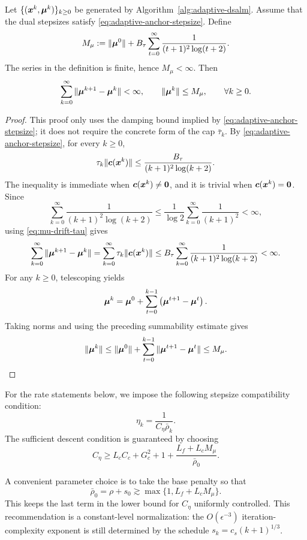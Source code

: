 \documentclass[10pt]{article}
\begin{document}
\begin{lemma}
\label{lem:mu-bounded-summable-damping}
Let $\{(\bm{x}^k,\bm{\mu}^k)\}_{k\ge 0}$ be generated by
Algorithm~\ref{alg:adaptive-dsalm}.  Assume that the dual stepsizes satisfy
\eqref{eq:adaptive-anchor-stepsize}.
Define
\[
    M_\mu
    :=
    \|\bm{\mu}^0\|
    +
    B_\tau
    \sum_{t=0}^{\infty}
    \frac{1}{(t+1)^2\log(t+2)}.
\]
The series in the definition is finite, hence $M_\mu<\infty$.
Then
\[
    \sum_{k=0}^{\infty}\|\bm{\mu}^{k+1}-\bm{\mu}^k\|
    <
    \infty,
    \qquad
    \|\bm{\mu}^k\|\le M_\mu,
    \qquad
    \forall k\ge0.
\]
\end{lemma}

\begin{proof}
This proof only uses the damping bound implied by
\eqref{eq:adaptive-anchor-stepsize}; it does not require the concrete form of
the cap $\bar\tau_k$.  By
\eqref{eq:adaptive-anchor-stepsize}, for every $k\ge0$,
\[
    \tau_k\|\bm{c}(\bm{x}^k)\|
    \le
    \frac{B_\tau}{(k+1)^2\log(k+2)}.
\]
The inequality is immediate when $\bm{c}(\bm{x}^k)\ne\bm{0}$, and it is trivial
when $\bm{c}(\bm{x}^k)=\bm{0}$.  Since
\[
    \sum_{k=0}^{\infty}
    \frac{1}{(k+1)^2\log(k+2)}
    \le
    \frac{1}{\log 2}
    \sum_{k=0}^{\infty}\frac{1}{(k+1)^2}
    <
    \infty,
\]
using \eqref{eq:mu-drift-tau} gives
\[
    \sum_{k=0}^{\infty}\|\bm{\mu}^{k+1}-\bm{\mu}^k\|
    =
    \sum_{k=0}^{\infty}
    \tau_k\|\bm{c}(\bm{x}^k)\|
    \le
    B_\tau
    \sum_{k=0}^{\infty}
    \frac{1}{(k+1)^2\log(k+2)}
    <
    \infty.
\]
For any $k\ge0$, telescoping yields
\[
    \bm{\mu}^k
    =
    \bm{\mu}^0
    +
    \sum_{t=0}^{k-1}
    \left(\bm{\mu}^{t+1}-\bm{\mu}^t\right).
\]
Taking norms and using the preceding summability estimate gives
\[
    \|\bm{\mu}^k\|
    \le
    \|\bm{\mu}^0\|
    +
    \sum_{t=0}^{k-1}
    \|\bm{\mu}^{t+1}-\bm{\mu}^t\|
    \le
    M_\mu.
\]
\end{proof}

For the rate statements below, we impose the following stepsize compatibility
condition:
\[
    \eta_k = \frac{1}{C_\eta\bar\rho_k}.
\]
The sufficient descent condition is guaranteed by choosing
\[
    C_\eta
    \ge
    L_cC_c+G_c^2+1
    +
    \frac{L_f+L_cM_\mu}{\bar\rho_0}.
\]
\begin{remark}
A convenient parameter choice is to take the base penalty so that
\[
    \bar\rho_0=\rho+s_0
    \gtrsim
    \max\{1,L_f+L_cM_\mu\}.
\]
This keeps the last term in the lower bound for $C_\eta$ uniformly
controlled.  This recommendation is a constant-level normalization: the
$O(\epsilon^{-3})$ iteration-complexity exponent is still determined by the
schedule $s_k=c_s(k+1)^{1/3}$.
\end{remark}
\end{document}
